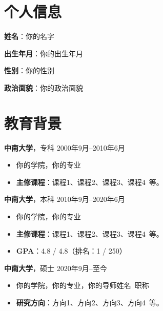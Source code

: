 \documentclass[11pt]{article}
\newlength{\iconwidth}
\begin{document}
    \begin{minipage}[t]{0.78\textwidth}
        \begin{minipage}[t]{\textwidth}
        \section[个人信息]{\makebox[\iconwidth][c]{\color{primary_color}{\faAddressCard}}\quad 个人信息}
        \begin{minipage}[t]{0.5\textwidth}
            \textbf{姓\qquad 名}：你的名字

            \vspace{0.5em}
            \textbf{出生年月}：你的出生年月
        \end{minipage}
        \begin{minipage}[t]{0.35\textwidth}
            \textbf{性\qquad 别}：你的性别

            \vspace{0.5em}
            \textbf{政治面貌}：你的政治面貌
        \end{minipage}
        \vspace{1.2em}
        \end{minipage}

        \begin{minipage}[t]{\textwidth}
        \section[教育背景]{\makebox[\iconwidth][c]{\color{primary_color}{\faGraduationCap}}\quad 教育背景}

        {\large \textbf{中南大学}}，专科 \hfill 2000年9月--2010年6月
        \begin{itemize}
            \item 你的学院，你的专业
            \item \textbf{主修课程}：课程1、课程2、课程3、课程4\ 等。
        \end{itemize}

        \vspace{0.5em}
        {\large \textbf{中南大学}}，本科 \hfill 2010年9月--2020年6月
        \begin{itemize}
            \item 你的学院，你的专业
            \item \textbf{主修课程}：课程1、课程2、课程3、课程4\ 等。
            \item \textbf{GPA}：4.8 / 4.8（排名：1 / 250）
        \end{itemize}

        \vspace{0.5em}
        {\large \textbf{中南大学}}，硕士 \hfill 2020年9月--至今
        \begin{itemize}
            \item 你的学院，你的专业，你的导师姓名\ 职称
            \item \textbf{研究方向}：方向1、方向2、方向3、方向4\ 等。
        \end{itemize}

        \vspace{1.2em}
        \end{minipage}
    \end{minipage}
\end{document}
